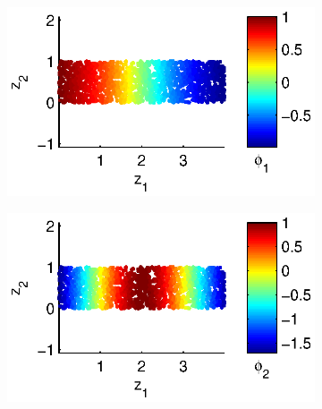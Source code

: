 \documentclass[preprint]{elsarticle}
\begin{document}
\begin{figure}[t]
\centering
\begin{subfigure}{0.45\textwidth}
\includegraphics[width=\textwidth]{strip_discrete1}
\end{subfigure}
%
\begin{subfigure}{0.45\textwidth}
\includegraphics[width=\textwidth]{strip_discrete2}
\end{subfigure}


\end{figure}
\end{document}

